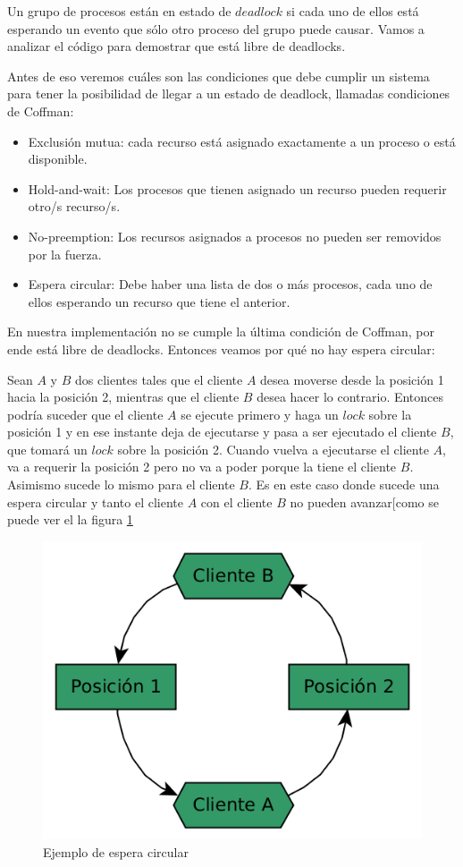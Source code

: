\label{sec:deadlock}
Un grupo de procesos están en estado de $deadlock$ si cada uno de ellos está esperando un evento que sólo otro proceso del grupo puede causar.
Vamos a analizar el código para demostrar que está libre de deadlocks.

Antes de eso veremos cuáles son las condiciones que debe cumplir un sistema para tener la posibilidad de llegar a un estado de deadlock, llamadas
condiciones de Coffman:
\begin{itemize}
 \item Exclusión mutua: cada recurso está asignado exactamente a un proceso o está disponible.
 \item Hold-and-wait: Los procesos que tienen asignado un recurso pueden requerir otro/s recurso/s.
 \item No-preemption: Los recursos asignados a procesos no pueden ser removidos por la fuerza.
 \item Espera circular: Debe haber una lista de dos o más procesos, cada uno de ellos esperando un recurso que tiene el anterior.
\end{itemize}

En nuestra implementación no se cumple la última condición de Coffman, por ende está libre de deadlocks.
Entonces veamos por qué no hay espera circular:

Sean $A$ y $B$ dos clientes tales que el cliente $A$ desea moverse desde la posición 1 hacia la posición 2, mientras que el cliente $B$ desea hacer lo contrario. Entonces podría suceder que el cliente $A$ se ejecute primero y haga un $lock$ sobre la posición 1 y en ese instante deja de ejecutarse y pasa a ser ejecutado el cliente $B$, que tomará un $lock$ sobre la posición 2. Cuando vuelva a ejecutarse el cliente $A$, va a requerir la posición 2 pero no va a poder porque la tiene el cliente $B$. Asimismo sucede lo mismo para el cliente $B$. Es en este caso donde sucede una espera circular y tanto el cliente $A$ con el cliente $B$ no pueden avanzar[como se puede ver el la figura \ref{fig:espera_1}

\begin{figure}[H]
	\centering
	\includegraphics[scale=0.35]{imgs/espera_circular.png}
	\caption{Ejemplo de espera circular}
	\label{fig:espera_1}
\end{figure}

